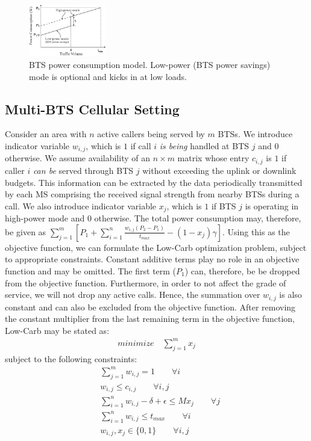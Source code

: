 \begin{figure}
\centering
\includegraphics[width=0.3\textwidth]{pics/powermodel.eps}
\caption{BTS power consumption model. Low-power (BTS power savings) mode is optional and kicks in at low loads.}
\label{fig:powermodel}
\end{figure}

\subsection{Multi-BTS Cellular Setting}
\label{subsec:case2:instantiate:multi-cell}
Consider an area with $n$ active callers being served by $m$ BTSs. We introduce indicator variable $w_{i,j}$, which is $1$ if call $i$ \textit{is being} handled at BTS $j$ and $0$ otherwise. We assume availability of an $n\times m$ matrix whose entry $c_{i,j}$ is $1$ if caller $i$ \textit{can be} served through
BTS $j$ without exceeding the uplink or downlink budgets. This information can be extracted by the data periodically transmitted by each MS comprising the received signal strength from nearby BTSs during a call. We also introduce indicator variable $x_j$, which is $1$ if BTS $j$ is operating in high-power mode and $0$ otherwise. The total power consumption may, therefore, be given as $\sum_{j=1}^{m} \left[P_1+\sum_{i=1}^{n}\frac{w_{i,j}(P_2-P_1)}{t_{max}}-(1-x_j)\gamma\right]$. Using this as the objective function, we can formulate the Low-Carb optimization problem, subject to appropriate constraints. Constant additive terms play no role in an objective function and may be omitted. The first term ($P_1$) can, therefore, be be dropped from the objective function. Furthermore, in order to not affect the grade of service, we will not drop any active calls. Hence, the summation over $w_{i,j}$ is also constant and can also be excluded from the objective function. After removing the constant multiplier from the last remaining term in the objective function, Low-Carb may be stated as:
\begin{align}
\textit{minimize} \quad \sum_{j=1}^{m} x_j
\end{align}
subject to the following constraints:
\begin{align}
& \sum_{j=1}^m w_{i,j} = 1 \qquad \forall i \\
& w_{i,j} \leq c_{i,j} \qquad \forall i, j \\
& \sum_{i=1}^nw_{i,j}-\delta + \epsilon \leq Mx_j \qquad \forall j \\
& \sum_{i=1}^n w_{i,j} \le t_{max} \qquad \forall i \\
& w_{i,j}, x_j \in \{0,1\} \qquad \forall i, j%
\end{align}

